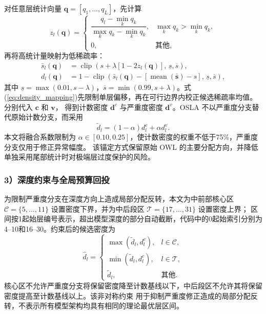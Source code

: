 \documentclass[UTF8,fontset=fandol]{ctexart}
\begin{document}
对任意层统计向量 $\bm q=[q_1,\ldots,q_L]$，先计算
\begin{equation}
z_l(\bm q)=
\begin{cases}
\dfrac{q_l-\min_k q_k}{\max_k q_k-\min_k q_k},
& \max_k q_k>\min_k q_k,\\[6pt]
0,&\text{其他},
\end{cases}
\label{eq:minmax}
\end{equation}
再将高统计量映射为低稀疏率：
\begin{equation}
\begin{aligned}
\bar s_l(\bm q)
&=\operatorname{clip}\!\left(
s+\lambda[1-2z_l(\bm q)],\,
\underline s,\overline s\right),\\
d_l(\bm q)&=
1-\operatorname{clip}\!\left(
\bar s_l(\bm q)-[\operatorname{mean}(\bar{\bm s})-s],\,
\underline s,\overline s\right),
\end{aligned}
\label{eq:density_mapping}
\end{equation}
其中 $\underline s=\max(0.01,s-\lambda)$，$\overline s=\min(0.99,s+\lambda)$。式
(\ref{eq:density_mapping})先限制单层偏移，再在可行边界内校正候选稀疏率均值。分别代入 $\bm c$ 和 $\bm v$，
得到计数密度 $\bm d^c$ 与严重度密度 $\bm d^v$。OSLA 不以严重度分支替代原始计数分支，而采用
\begin{equation}
\widetilde d_l=(1-\alpha)d_l^c+\alpha d_l^v .
\label{eq:fusion}
\end{equation}
本文将融合系数限制为 $\alpha\in[0.10,0.25]$，使计数密度的权重不低于75\%，严重度分支仅用于修正异常幅度。
该锚定方式保留原始 OWL 的主要分配方向，并降低单独采用尾部统计时对极端层过度保护的风险。

\subsubsection*{3）深度约束与全局预算回投}

为限制严重度分支在深度方向上造成局部分配反转，本文为中前部核心区
$\mathcal C=\{5,\ldots,11\}$ 设置密度下界，并为中后段区 $\mathcal T=\{17,\ldots,31\}$ 设置密度上界；
区间按1起始层编号表示，超出模型深度的部分自动截断，代码中的0起始索引分别为4--10和16--30。约束后的候选密度为
\begin{equation}
\widehat d_l=
\begin{cases}
\max(\widetilde d_l,d_l^c), & l\in\mathcal C,\\
\min(\widetilde d_l,d_l^c), & l\in\mathcal T,\\
\widetilde d_l, & \text{其他}.
\end{cases}
\label{eq:depth_constraints}
\end{equation}
核心区不允许严重度分支将保留密度降至计数基线以下，中后段区不允许其将保留密度提高至计数基线以上。该非对称约束
用于抑制严重度修正造成的局部分配反转，不表示所有模型架构均具有相同的理论最优层区间。
\end{document}
